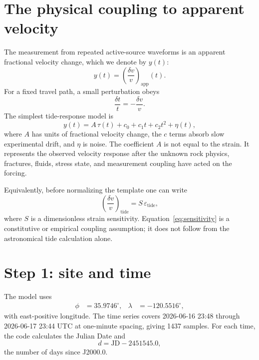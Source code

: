 \documentclass[11pt]{article}
\newcommand{\eps}{\varepsilon}
\begin{document}
\section{The physical coupling to apparent velocity}

The measurement from repeated active-source waveforms is an apparent
fractional velocity change, which we denote by $y(t)$:
\begin{equation}
  y(t) = \left(\frac{\delta v}{v}\right)_{\!\mathrm{app}}(t).
\end{equation}
For a fixed travel path, a small perturbation obeys
\begin{equation}
  \frac{\delta t}{t} = -\frac{\delta v}{v}.
\end{equation}
The simplest tide-response model is
\begin{equation}
  y(t) = A\,\tau(t) + c_0+c_1t+c_2t^2+\eta(t),
  \label{eq:fit}
\end{equation}
where $A$ has units of fractional velocity change, the $c$ terms absorb slow
experimental drift, and $\eta$ is noise.  The coefficient $A$ is not equal to
the strain.  It represents the observed velocity response after the unknown
rock physics, fractures, fluids, stress state, and measurement coupling have
acted on the forcing.

Equivalently, before normalizing the template one can write
\begin{equation}
  \left(\frac{\delta v}{v}\right)_{\!\mathrm{tide}}
  = S\,\eps_{\mathrm{tide}},
  \label{eq:sensitivity}
\end{equation}
where $S$ is a dimensionless strain sensitivity.  Equation~\eqref{eq:sensitivity}
is a constitutive or empirical coupling assumption; it does not follow from
the astronomical tide calculation alone.

\section{Step 1: site and time}

The model uses
\begin{align}
  \phi &= 35.9746^\circ, &
  \lambda &= -120.5516^\circ,
\end{align}
with east-positive longitude.  The time series covers
2026-06-16 23:48 through 2026-06-17 23:44 UTC at one-minute spacing, giving
1437 samples.  For each time, the code calculates the Julian Date and
\begin{equation}
  d = \mathrm{JD}-2451545.0,
\end{equation}
the number of days since J2000.0.
\end{document}
